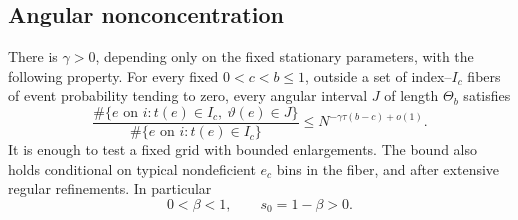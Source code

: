 \subsection{Angular nonconcentration}

\begin{lemma}
\label{lem:angular-frostman}
There is $\gamma>0$, depending only on the fixed stationary parameters,
with the following property. For every fixed $0<c<b\le1$, outside a
set of index--$I_c$ fibers of event probability tending to zero, every
angular interval $J$ of length $\Theta_b$ satisfies
\begin{equation}
 \frac{\#\{e\text{ on }i:t(e)\in I_c,
                         \ \vartheta(e)\in J\}}
      {\#\{e\text{ on }i:t(e)\in I_c\}}
 \le N^{-\gamma\tau(b-c)+o(1)}.
\label{eq:angular-frostman}
\end{equation}
It is enough to test a fixed grid with bounded enlargements. The bound
also holds conditional on typical nondeficient $e_c$ bins in the fiber,
and after extensive regular refinements. In particular
\begin{equation}
 0<\beta<1,\qquad s_0=1-\beta>0.
\label{eq:positive-time-dimension}
\end{equation}
\end{lemma}


